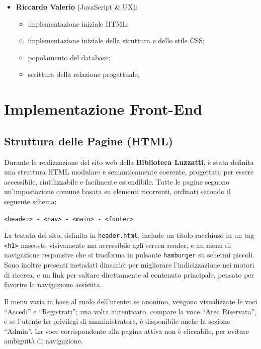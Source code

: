 \documentclass{article}
\begin{document}
\begin{itemize}
\begin{itemize}
            \end{itemize}
   \item \textbf{Riccardo Valerio} (JavaScript \& UX):
            \begin{itemize}
                \item implementazione iniziale HTML;
                \item implementazione iniziale della struttura e dello stile CSS;
                \item popolamento del database;
                \item scrittura della relazione progettuale.
            \end{itemize}
\end{itemize}


\newpage

\section{Implementazione Front-End}

\subsection{Struttura delle Pagine (HTML)}

Durante la realizzazione del sito web della \textbf{Biblioteca Luzzatti}, è stata definita una struttura HTML modulare e semanticamente coerente, progettata per essere accessibile, riutilizzabile e facilmente estendibile.  
Tutte le pagine seguono un’impostazione comune basata su elementi ricorrenti, ordinati secondo il seguente schema:

\begin{center}
\texttt{\textless header\textgreater{} - \textless nav\textgreater{} - \textless main\textgreater{} - \textless footer\textgreater{}}
\end{center}

La testata del sito, definita in \texttt{header.html}, include un titolo racchiuso in un tag \texttt{<h1>} nascosto visivamente ma accessibile agli screen reader, e un menu di navigazione responsive che si trasforma in pulsante \texttt{hamburger} su schermi piccoli.  
Sono inoltre presenti metadati dinamici per migliorare l’indicizzazione nei motori di ricerca, e un link per saltare direttamente al contenuto principale, pensato per favorire la navigazione assistita.

Il menu varia in base al ruolo dell’utente: se anonimo, vengono visualizzate le voci “Accedi” e “Registrati”; una volta autenticato, compare la voce “Area Riservata”, e se l’utente ha privilegi di amministratore, è disponibile anche la sezione “Admin”. La voce corrispondente alla pagina attiva non è cliccabile, per evitare ambiguità di navigazione.
\end{document}
